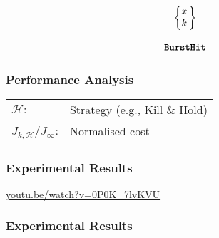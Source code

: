 \begin{frame}
    \vspace{1cm}

    \large
    \begin{equation*}
        \begin{matrix}
            \left\{\begin{matrix}
                x \\
                k
            \end{matrix}\,\right\} \\
                                 \\
            \texttt{\textbf{BurstHit}}
        \end{matrix}
    \end{equation*}
\end{frame}


\begin{frame}
    \frametitle{Performance Analysis}
    \begin{figure}[h]
        \centering
        
    \end{figure}

    \centering
    \begin{tabular}{l l}
        $\mathcal{H}:$ & Strategy (e.g., Kill \& Hold)\\
        $J_{k,\mathcal{H}}/J_\infty$: & Normalised cost \\
    \end{tabular}
\end{frame}




\begin{frame}
    \frametitle{Experimental Results}
    \centering
    \LARGE
    \textcolor{blue}{\url{youtu.be/watch?v=0P0K\_7lvKVU}}
\end{frame}


\begin{frame}
    \frametitle{Experimental Results}
    \begin{figure}[h]
        \centering
        \resizebox{0.85\textwidth}{!}{}
    \end{figure}
\end{frame}
